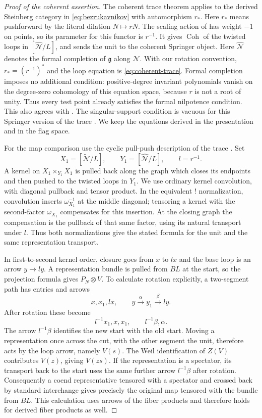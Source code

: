 \documentclass[11pt]{article}
\numberwithin{equation}{section}
\theoremstyle{definition}
\theoremstyle{remark}
\newcommand{\g}{\mathfrak g}
\newcommand{\cN}{\mathcal N}
\newcommand{\Coh}{\operatorname{Coh}}
\begin{document}
\begin{proof}[Proof of the coherent assertion]
The coherent trace theorem
\cite[Theorems~1.19(2)--(3) and~3.23]{Local:BZCHN} applies to the
derived Steinberg category in \eqref{eq:bezrukavnikov} with
automorphism $r_*$.  Here $r_*$ means pushforward by the literal
dilation $N\mapsto rN$.  The scaling action of
\cite[Section~1.6.3]{Local:BZCHN} has weight $-1$ on points, so its
parameter for this functor is $r^{-1}$.
It gives $\Coh$ of the twisted loops in
$[\widehat{\cN}/L]$, and sends the unit to the coherent Springer
object.  Here $\widehat{\cN}$ denotes the formal completion of $\g$
along $\cN$.  With our rotation convention, $r_*=(r^{-1})^*$ and the
loop equation is \eqref{eq:coherent-trace}.  Formal completion imposes
no additional condition: positive-degree invariant polynomials vanish
on the degree-zero cohomology of this equation space, because $r$ is
not a root of unity.  Thus every test point already satisfies the
formal nilpotence condition.  This also agrees with
\cite[Proposition~4.3]{Local:BZCHN}.  The singular-support condition
is vacuous for this Springer version of the trace
\cite[Remark~4.14]{Local:BZCHN}.  We keep the equations derived in
the presentation and in the flag space.

For the map comparison use the cyclic pull-push description of the
trace \cite[Theorem~3.23]{Local:BZCHN}.  Set
\[
 X_1=[\widetilde{\cN}/L],\qquad
 Y_1=[\widehat{\cN}/L],\qquad l=r^{-1}.
\]
A kernel on $X_1\times_{Y_1}X_1$ is pulled back along the graph which
closes its endpoints and then pushed to the twisted loops in $Y_1$.
We use ordinary kernel convolution, with diagonal pullback and tensor
product.  In the equivalent $!$ normalization, convolution inserts
$\omega_{X_1}^{-1}$ at the middle diagonal; tensoring a kernel with
the second-factor $\omega_{X_1}$ compensates for this insertion.  At
the closing graph the compensation is the pullback of that same
factor, using its natural transport under $l$.  Thus both
normalizations give the stated formula for the unit and the same
representation transport.

In first-to-second kernel order, closure goes from $x$ to $lx$ and
the base loop is an arrow $y\to ly$.  A representation bundle is
pulled from $BL$ at the start, so the projection formula gives
$P_N\otimes V$.  To calculate rotation explicitly, a two-segment
path has entries and arrows
\[
 x,x_1,lx,\qquad
 y\xrightarrow{\alpha}y_1\xrightarrow{\beta}ly.
\]
After rotation these become
\[
 l^{-1}x_1,x,x_1,\qquad l^{-1}\beta,\alpha.
\]
The arrow $l^{-1}\beta$ identifies the new start with the old start.
Moving a representation once across the cut, with the other segment
the unit, therefore acts by the loop arrow, namely $V(s)$.  The Weil
identification of $Z(V)$ contributes $V(z)$, giving $V(zs)$.  If the
representation is a spectator, its transport back to the start uses
the same further arrow $l^{-1}\beta$ after rotation.  Consequently a
coend representative tensored with a spectator and crossed back by
standard interchange gives precisely the original map tensored with
the bundle from $BL$.  This calculation uses arrows of the fiber
products and therefore holds for derived fiber products as well.


\end{proof}
\end{document}
